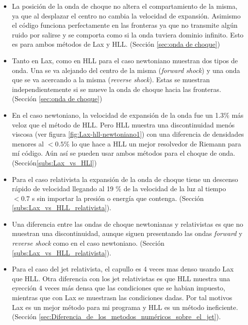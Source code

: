 \documentclass[12pt,a4paper]{book}
\begin{document}
\begin{itemize}
\item La posición de la onda de choque no altera el compartamiento de la misma, ya que al desplazar el centro no cambia la velocidad de expansión. Asimismo el código funciona perfectamente en las fronteras ya que no transmite algún ruido por salirse y se comporta como si la onda tuviera dominio infinito. Esto es para ambos métodos de Lax y HLL. (Sección \ref{sec:onda de choque})

\item Tanto en Lax, como en HLL para el caso newtoniano muestran dos tipos de onda. Una se va alejando del centro de la misma (\emph{forward shock}) y una onda que se va acercando a la misma (\emph{reverse shock}). Estas se muestran independientemente si se mueve la onda de choque hacia las fronteras. (Sección \ref{sec:onda de choque})

\item En el caso newtoniano, la velocidad de expansión de la onda fue un 1.3\% más veloz que el método de HLL. Pero HLL muestra una discontinuidad menós viscosa (ver figura \ref{fig:Lax-hll-newtoniano1}) con una diferencia de densidades menores al $<0.5 \% $ lo que hace 
a HLL un mejor resolvedor de Riemann para mí código. Aún así se pueden usar ambos métodos para el choque de onda. (Sección\ref{subs:Lax_vs_HLl})

\item Para el caso relativista la expansión de la onda de choque tiene un descenso rápido de velocidad llegando al 19 \% de la velocidad de la luz al tiempo $< 0.7$ s sin importar la presión o energía que contenga. (Sección \ref{subs:Lax_vs_HLL_relativista}).

\item Una diferencia entre las ondas de choque newtonianas y relativistas es que no muestran una discontinuidad, aunque siguen presentando las ondas \emph{forward} y \emph{reverse shock} como en el caso newtoniano. (Sección \ref{subs:Lax_vs_HLL_relativista}).

\item Para el caso del jet relativista, el capullo es 4 veces mas denso usando Lax que HLL. Otra diferencia con los jet relativistas es que HLL muestra una eyección 4 veces más densa que las condiciones que se habian impuesto, mientras que con Lax se muestrasn las condiciones dadas. Por tal motivos Lax es un mejor método para mi programa y HLL es un método ineficiente. (Sección \ref{sec:Diferencia_de_los_metodos_numéricos_sobre_el_jet}).


\end{itemize}
\end{document}
